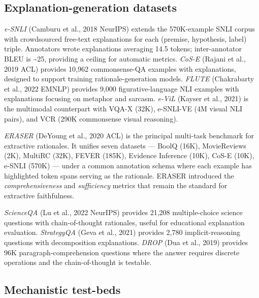 \subsection{Explanation-generation datasets}\label{explanation-generation-datasets}

\emph{e-SNLI} (Camburu et al., 2018 NeurIPS) extends the 570K-example SNLI corpus with crowdsourced free-text explanations for each (premise, hypothesis, label) triple. Annotators wrote explanations averaging 14.5 tokens; inter-annotator BLEU is \textasciitilde25, providing a ceiling for automatic metrics. \emph{CoS-E} (Rajani et al., 2019 ACL) provides 10,962 commonsense-QA examples with explanations, designed to support training rationale-generation models. \emph{FLUTE} (Chakrabarty et al., 2022 EMNLP) provides 9,000 figurative-language NLI examples with explanations focusing on metaphor and sarcasm. \emph{e-ViL} (Kayser et al., 2021) is the multimodal counterpart with VQA-X (32K), e-SNLI-VE (4M visual NLI pairs), and VCR (290K commonsense visual reasoning).

\emph{ERASER} (DeYoung et al., 2020 ACL) is the principal multi-task benchmark for extractive rationales. It unifies seven datasets --- BoolQ (16K), MovieReviews (2K), MultiRC (32K), FEVER (185K), Evidence Inference (10K), CoS-E (10K), e-SNLI (570K) --- under a common annotation schema where each example has highlighted token spans serving as the rationale. ERASER introduced the \emph{comprehensiveness} and \emph{sufficiency} metrics that remain the standard for extractive faithfulness.

\emph{ScienceQA} (Lu et al., 2022 NeurIPS) provides 21,208 multiple-choice science questions with chain-of-thought rationales, useful for educational explanation evaluation. \emph{StrategyQA} (Geva et al., 2021) provides 2,780 implicit-reasoning questions with decomposition explanations. \emph{DROP} (Dua et al., 2019) provides 96K paragraph-comprehension questions where the answer requires discrete operations and the chain-of-thought is testable.

\subsection{Mechanistic test-beds}\label{mechanistic-test-beds}

